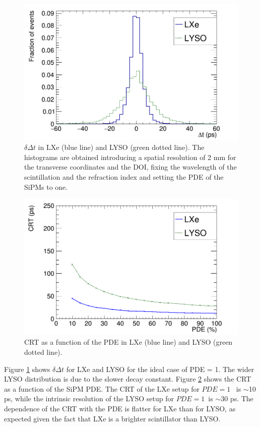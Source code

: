 \documentclass[review]{elsarticle}
\begin{document}
\begin{figure}[!bhtp]
	\centering
	\includegraphics[scale=0.4]{../img/DTOFLXeLYSO.png}
	\caption{\label{fig.dtof} $\delta \Delta t$ in LXe (blue line) and LYSO (green dotted line). The
	histograms are obtained introducing a spatial resolution of 2 mm for the transverse coordinates and
	the DOI, fixing the wavelength of the scintillation and the refraction index and setting the PDE of the SiPMs to one. }
\end{figure}

\begin{figure}[!bhtp]
	\centering
	\includegraphics[scale=0.4]{../img/CRTvsPDELXeLYSONoJitterFstPE.png}
	\caption{\label{fig.crt1} CRT as a function of the PDE in LXe (blue line) and LYSO (green dotted line). }
\end{figure}

 Figure \ref{fig.dtof} shows $\delta \Delta t$ for LXe and LYSO for the ideal case of PDE = 1. The wider LYSO distribution is due to the slower decay constant.  Figure \ref{fig.crt1} shows the CRT as a function of the
 SiPM PDE. The CRT of the LXe setup for $PDE=1$~ is $\sim$10 ps, while the
 intrinsic resolution of the LYSO setup for $PDE=1$~is $\sim$30 ps. The dependence of the CRT with the PDE is flatter for LXe than for LYSO, as expected given the fact that LXe is a brighter scintillator than LYSO. 
 
\end{document}
